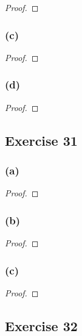\documentclass[14pt]{extarticle}
\begin{document}
\begin{proof}

\end{proof}

\subsubsection{(c)}

\begin{proof}

\end{proof}

\subsubsection{(d)}

\begin{proof}

\end{proof}

\subsection{Exercise 31}

\subsubsection{(a)}

\begin{proof}

\end{proof}

\subsubsection{(b)}

\begin{proof}

\end{proof}

\subsubsection{(c)}

\begin{proof}

\end{proof}

\subsection{Exercise 32}
\end{document}
